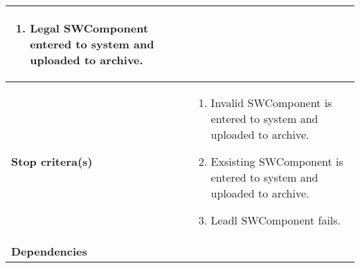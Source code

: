 \begin{table}[H]
\begin{tabular}{| p{4cm} | p{10cm} |}
\begin{enumerate}
						\item Legal SWComponent entered to system and uploaded to archive.
					\end{enumerate}
				\\ \hline
				{\bf Stop critera(s)} &  
					\begin{enumerate}
						\item Invalid SWComponent is entered to system and uploaded to archive.
						\item Exsisting SWComponent is entered to system and uploaded to archive.
						\item Leadl SWComponent fails.
					\end{enumerate} \\ \hline
				{\bf Dependencies} & \\ \hline
			\end{tabular}
		\end{table}

